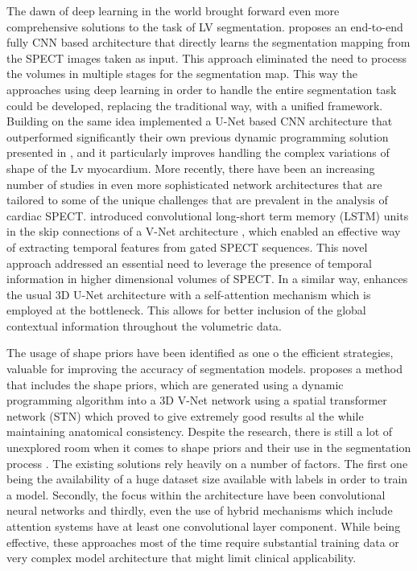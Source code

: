 The dawn of deep learning in the world brought forward even more comprehensive solutions to the task of LV segmentation. \cite{Wang2020} proposes an end-to-end fully CNN based architecture that directly learns the segmentation mapping from the SPECT images taken as input. This approach eliminated the need to process the volumes in multiple stages for the segmentation map. This way the approaches using deep learning in order to handle the entire segmentation task could be developed, replacing the traditional way, with a unified framework. Building on the same idea \cite{WEN2021166842} implemented a U-Net \cite{RFB15a} based CNN architecture that outperformed significantly their own previous dynamic programming solution presented in \cite{tang2017dynamic}, and it particularly improves handling the complex variations of shape of the Lv myocardium. More recently, there have been an increasing number of studies in even more sophisticated network architectures that are tailored to some of the unique challenges that are prevalent in the analysis of cardiac SPECT. \cite{zhao2023spatial} introduced convolutional long-short term memory (LSTM) units in the skip connections of a V-Net architecture \cite{7785132}, which enabled an effective way of extracting temporal features from gated SPECT sequences. This novel approach addressed an essential need to leverage the presence of temporal information in higher dimensional volumes of SPECT. In a similar way, \cite{ZHANG2023107267} enhances the usual 3D U-Net architecture with a self-attention mechanism which is employed at the bottleneck. This allows for better inclusion of the global contextual information throughout the volumetric data.

The usage of shape priors have been identified as one o the efficient strategies, valuable for improving the accuracy of segmentation models. \cite{ZHU2023106954} proposes a method that includes the shape priors, which are generated using a dynamic programming algorithm into a 3D V-Net network using a spatial transformer network (STN) which proved to give extremely good results al the while maintaining anatomical consistency. Despite the research, there is still a lot of unexplored room when it comes to shape priors and their use in the segmentation process \cite{Wang2020}. The existing solutions rely heavily on a number of factors. The first one being the availability of a huge dataset size available with labels in order to train a model. Secondly, the focus within the architecture have been convolutional neural networks and thirdly, even the use of hybrid mechanisms which include attention systems have at least one convolutional layer component. While being effective, these approaches most of the time require substantial training data or very complex model architecture that might limit clinical applicability.


